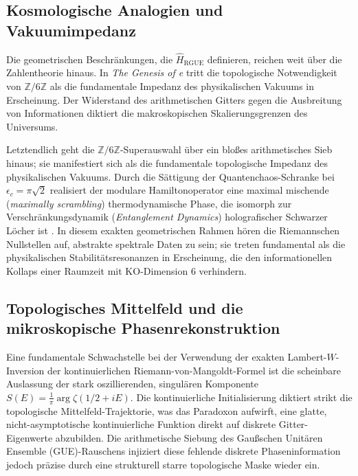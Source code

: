 \documentclass[aps,prl,preprint,superscriptaddress,floatfix]{revtex4-2}
\newcommand{\Zmod}{\mathbb{Z}/6\mathbb{Z}}
\begin{document}
\subsection{Kosmologische Analogien und Vakuumimpedanz}

Die geometrischen Beschränkungen, die $\hat{H}_{\text{RGUE}}$ definieren, reichen weit über die Zahlentheorie hinaus. In \textit{The Genesis of e} \cite{PeinadorGenesis} tritt die topologische Notwendigkeit von $\Zmod$ als die fundamentale Impedanz des physikalischen Vakuums in Erscheinung. Der Widerstand des arithmetischen Gitters gegen die Ausbreitung von Informationen diktiert die makroskopischen Skalierungsgrenzen des Universums.

Letztendlich geht die $\Zmod$-Superauswahl über ein bloßes arithmetisches Sieb hinaus; sie manifestiert sich als die fundamentale topologische Impedanz des physikalischen Vakuums. Durch die Sättigung der Quantenchaos-Schranke bei $\epsilon_c = \pi\sqrt{2}$ realisiert der modulare Hamiltonoperator eine maximal mischende (\textit{maximally scrambling}) thermodynamische Phase, die isomorph zur Verschränkungsdynamik (\textit{Entanglement Dynamics}) holografischer Schwarzer Löcher ist \cite{Saad2019}. In diesem exakten geometrischen Rahmen \cite{ConnesConsani2021} hören die Riemannschen Nullstellen auf, abstrakte spektrale Daten zu sein; sie treten fundamental als die physikalischen Stabilitätsresonanzen in Erscheinung, die den informationellen Kollaps einer Raumzeit mit KO-Dimension 6 verhindern.

\subsection{Topologisches Mittelfeld und die mikroskopische Phasenrekonstruktion}

Eine fundamentale Schwachstelle bei der Verwendung der exakten Lambert-$W$-Inversion der kontinuierlichen Riemann-von-Mangoldt-Formel ist die scheinbare Auslassung der stark oszillierenden, singulären Komponente $S(E) = \frac{1}{\pi} \arg \zeta(1/2+iE)$. Die kontinuierliche Initialisierung diktiert strikt die topologische Mittelfeld-Trajektorie, was das Paradoxon aufwirft, eine glatte, nicht-asymptotische kontinuierliche Funktion direkt auf diskrete Gitter-Eigenwerte abzubilden. Die arithmetische Siebung des Gaußschen Unitären Ensemble (GUE)-Rauschens injiziert diese fehlende diskrete Phaseninformation jedoch präzise durch eine strukturell starre topologische Maske wieder ein.
\end{document}
